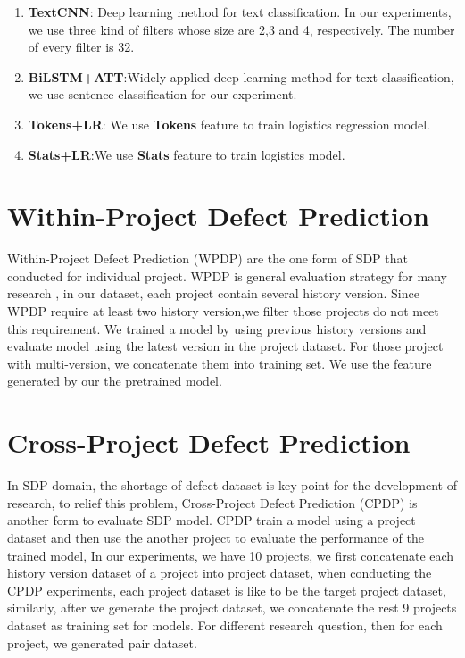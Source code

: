 \begin{enumerate}
    \item \textbf{TextCNN}: Deep learning method for text classification. In our experiments, we use three kind of filters whose size are 2,3 and 4, respectively. The number of every filter is 32.
    \item \textbf{BiLSTM+ATT}:Widely applied deep learning method for text classification, we use sentence classification for our experiment.
    \item \textbf{Tokens+LR}: We use \textbf{Tokens} feature to train logistics regression model. 
    \item \textbf{Stats+LR}:We use \textbf{Stats} feature to train logistics model.
\end{enumerate}

\section{Within-Project Defect Prediction}
Within-Project Defect Prediction (WPDP) are the one form of SDP that conducted for individual project. WPDP is general evaluation strategy for many research \cite{}, in our dataset, each project contain several history version. Since WPDP require at least two history version,we filter those projects do not meet this requirement. We trained a model by using previous history versions and evaluate model using the latest version in the project dataset.  For those project with multi-version, we concatenate them into training set. We use the feature generated by our the pretrained model.

\section{Cross-Project Defect Prediction}
In SDP domain, the shortage of defect dataset is key point for the development of research, to relief this problem, Cross-Project Defect Prediction (CPDP) is another form to evaluate SDP model. CPDP train a model using a project dataset and then use the another project to evaluate the performance of the trained model, In our experiments, we have 10 projects, we first concatenate each history version dataset of a project into project dataset, when conducting the CPDP experiments, each project dataset is like to be the target project dataset, similarly, after we generate the project dataset, we concatenate the rest 9 projects dataset as training set for models. For different research question, then for each project, we generated pair dataset.

